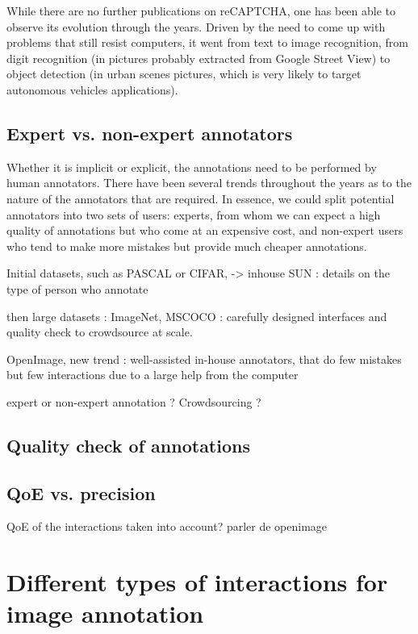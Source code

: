 While there are no further publications on reCAPTCHA, one has been able to observe its evolution through the years. Driven by the need to come up with problems that still resist computers, it went from text to image recognition, from digit recognition (in pictures probably extracted from Google Street View) to object detection (in urban scenes pictures, which is very likely to target autonomous vehicles applications).


\subsection{Expert vs. non-expert annotators}

Whether it is implicit or explicit, the annotations need to be performed by human annotators. There have been several trends throughout the years as to the nature of the annotators that are required. In essence, we could split potential annotators into two sets of users: experts, from whom we can expect a high quality of annotations but who come at an expensive cost, and non-expert users who tend to make more mistakes but provide much cheaper annotations.

Initial datasets, such as PASCAL or CIFAR, -> inhouse 
SUN : details on the type of person who annotate

then large datasets : ImageNet, MSCOCO : carefully designed interfaces and quality check to crowdsource at scale.

OpenImage, new trend : well-assisted in-house annotators, that do few mistakes but few interactions due to a large help from the computer




expert or non-expert annotation ? Crowdsourcing ?

\subsection{Quality check of annotations}



\subsection{QoE vs. precision}
QoE of the interactions taken into account?
parler de openimage

\section{Different types of interactions for image annotation}

